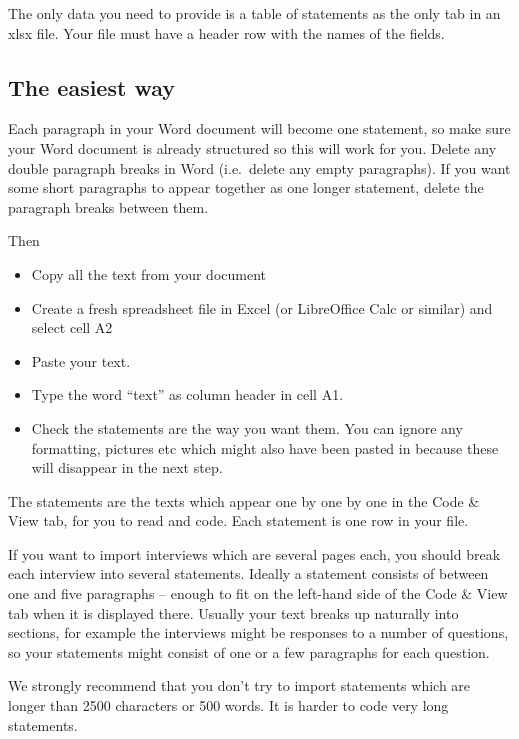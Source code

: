 \documentclass[
]{book}
\providecommand{\tightlist}{%
  \setlength{\itemsep}{0pt}\setlength{\parskip}{0pt}}
\begin{document}
The only data you need to provide is a table of statements as the only tab in an xlsx file. Your file must have a header row with the names of the fields.

\hypertarget{the-easiest-way-1}{%
\subsection{The easiest way}\label{the-easiest-way-1}}

Each paragraph in your Word document will become one statement, so make sure your Word document is already structured so this will work for you. Delete any double paragraph breaks in Word (i.e.~delete any empty paragraphs). If you want some short paragraphs to appear together as one longer statement, delete the paragraph breaks between them.

Then

\begin{itemize}
\tightlist
\item
  Copy all the text from your document
\item
  Create a fresh spreadsheet file in Excel (or LibreOffice Calc or similar) and select cell A2
\item
  Paste your text.
\item
  Type the word ``text'' as column header in cell A1.
\item
  Check the statements are the way you want them. You can ignore any formatting, pictures etc which might also have been pasted in because these will disappear in the next step.
\end{itemize}

The statements are the texts which appear one by one by one in the Code \& View tab, for you to read and code. Each statement is one row in your file.

If you want to import interviews which are several pages each, you should break each interview into several statements. Ideally a statement consists of between one and five paragraphs -- enough to fit on the left-hand side of the Code \& View tab when it is displayed there. Usually your text breaks up naturally into sections, for example the interviews might be responses to a number of questions, so your statements might consist of one or a few paragraphs for each question.

We strongly recommend that you don't try to import statements which are longer than 2500 characters or 500 words. It is harder to code very long statements.
\end{document}
